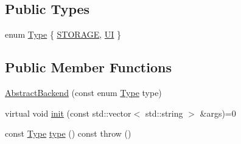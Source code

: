 \subsection*{Public Types}
\begin{DoxyCompactItemize}
\item 
enum \hyperlink{classAbstractBackend_a09da2d2fbf0862fb2af3928b438535d2}{Type} \{ \hyperlink{classAbstractBackend_a09da2d2fbf0862fb2af3928b438535d2ac0a0df2995db93384337b95598559a36}{STORAGE}, 
\hyperlink{classAbstractBackend_a09da2d2fbf0862fb2af3928b438535d2adcd5d3a3c71967aa82d09038477173ba}{UI}
 \}
\end{DoxyCompactItemize}
\subsection*{Public Member Functions}
\begin{DoxyCompactItemize}
\item 
\hyperlink{classAbstractBackend_ad91e2394ca45125ab197a15056e6a628}{AbstractBackend} (const enum \hyperlink{classAbstractBackend_a09da2d2fbf0862fb2af3928b438535d2}{Type} type)
\item 
virtual void \hyperlink{classAbstractBackend_afce49841a79e3093a1fbf199bfd9f698}{init} (const std::vector$<$ std::string $>$ \&args)=0
\item 
const \hyperlink{classAbstractBackend_a09da2d2fbf0862fb2af3928b438535d2}{Type} \hyperlink{classAbstractBackend_ae4f1fd32e7cff9d9d86e7b9fc6852668}{type} () const   throw ()
\end{DoxyCompactItemize}


